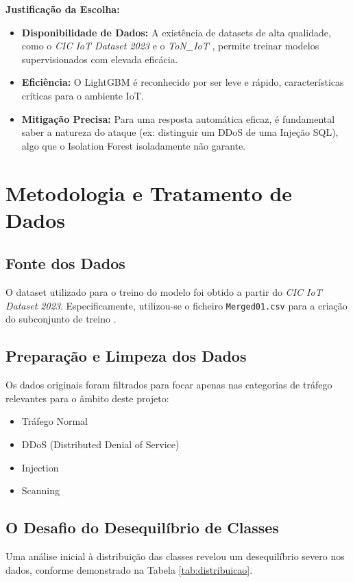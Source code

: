 \documentclass[12pt,a4paper]{article}
\begin{document}
\vspace{0.3cm}
\noindent \textbf{Justificação da Escolha:}
\begin{itemize}
    \item \textbf{Disponibilidade de Dados:} A existência de datasets de alta qualidade, como o \textit{CIC IoT Dataset 2023} \cite{cic_iot_dataset} e o \textit{ToN\_IoT} \cite{ton_iot_dataset}, permite treinar modelos supervisionados com elevada eficácia.
    \item \textbf{Eficiência:} O LightGBM é reconhecido por ser leve e rápido, características críticas para o ambiente IoT.
    \item \textbf{Mitigação Precisa:} Para uma resposta automática eficaz, é fundamental saber a natureza do ataque (ex: distinguir um DDoS de uma Injeção SQL), algo que o Isolation Forest isoladamente não garante.
\end{itemize}

\section{Metodologia e Tratamento de Dados}

\subsection{Fonte dos Dados}
O dataset utilizado para o treino do modelo foi obtido a partir do \textit{CIC IoT Dataset 2023}. Especificamente, utilizou-se o ficheiro \texttt{Merged01.csv} para a criação do subconjunto de treino \cite{merged_csv}.

\subsection{Preparação e Limpeza dos Dados}
Os dados originais foram filtrados para focar apenas nas categorias de tráfego relevantes para o âmbito deste projeto:
\begin{itemize}
    \item Tráfego Normal
    \item DDoS (Distributed Denial of Service)
    \item Injection
    \item Scanning
\end{itemize}

\subsection{O Desafio do Desequilíbrio de Classes}
Uma análise inicial à distribuição das classes revelou um desequilíbrio severo nos dados, conforme demonstrado na Tabela \ref{tab:distribuicao}.
\end{document}
